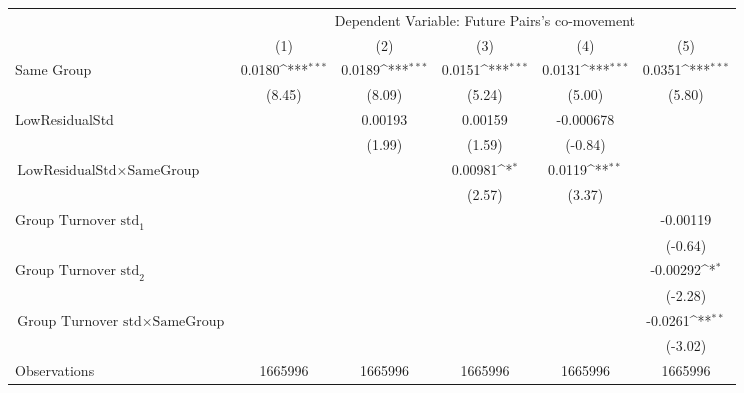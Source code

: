 {
\def\sym#1{\ifmmode^{#1}\else\(^{#1}\)\fi}
\begin{tabular}{l*{5}{c}}
\hline\hline
                &\multicolumn{5}{c}{Dependent Variable: Future Pairs's co-movement}                            \\\cmidrule(lr){2-6}
                &\multicolumn{1}{c}{(1)}         &\multicolumn{1}{c}{(2)}         &\multicolumn{1}{c}{(3)}         &\multicolumn{1}{c}{(4)}         &\multicolumn{1}{c}{(5)}         \\
\hline
Same Group      &   0.0180\sym{***}&   0.0189\sym{***}&   0.0151\sym{***}&   0.0131\sym{***}&   0.0351\sym{***}\\
                &   (8.45)         &   (8.09)         &   (5.24)         &   (5.00)         &   (5.80)         \\
[1em]
LowResidualStd  &                  &  0.00193         &  0.00159         &-0.000678         &                  \\
                &                  &   (1.99)         &   (1.59)         &  (-0.84)         &                  \\
[1em]
$ {\text{LowResidualStd} } \times {\text{SameGroup} }  $ &                  &                  &  0.00981\sym{*}  &   0.0119\sym{**} &                  \\
                &                  &                  &   (2.57)         &   (3.37)         &                  \\
[1em]
 $ {\text{Group Turnover std}_1} $ &                  &                  &                  &                  & -0.00119         \\
                &                  &                  &                  &                  &  (-0.64)         \\
[1em]
 $ {\text{Group Turnover std}_2} $ &                  &                  &                  &                  & -0.00292\sym{*}  \\
                &                  &                  &                  &                  &  (-2.28)         \\
[1em]
$ {\text{Group Turnover std} } \times {\text{SameGroup} }  $ &                  &                  &                  &                  &  -0.0261\sym{**} \\
                &                  &                  &                  &                  &  (-3.02)         \\
\hline
Observations    &  1665996         &  1665996         &  1665996         &  1665996         &  1665996         \\

\end{tabular}}
